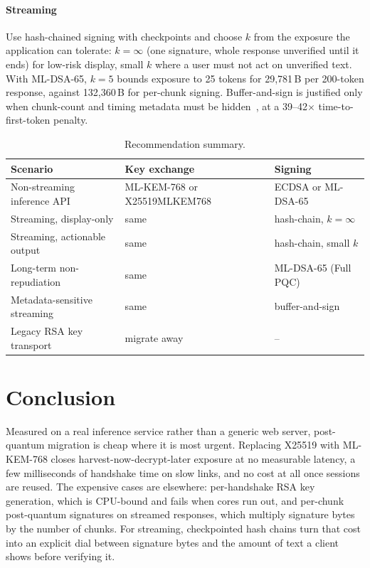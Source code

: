 \paragraph*{Streaming} Use hash-chained signing with checkpoints and choose $k$ from the exposure
the application can tolerate: $k=\infty$ (one signature, whole response unverified until it ends)
for low-risk display, small $k$ where a user must not act on unverified text. With ML-DSA-65,
$k{=}5$ bounds exposure to 25 tokens for 29,781\,B per 200-token response, against 132,360\,B for
per-chunk signing. Buffer-and-sign is justified only when chunk-count and timing metadata must be
hidden~\cite{weiss2024keylogging}, at a 39--42$\times$ time-to-first-token penalty.

\begin{table}[t]
\centering
\caption{Recommendation summary.}
\label{tab:recommendations}
\setlength{\tabcolsep}{3pt}
\begin{tabular}{@{}lll@{}}
\toprule
Scenario & Key exchange & Signing \\
\midrule
Non-streaming inference API & ML-KEM-768 or X25519MLKEM768 & ECDSA or ML-DSA-65 \\
Streaming, display-only & same & hash-chain, $k=\infty$ \\
Streaming, actionable output & same & hash-chain, small $k$ \\
Long-term non-repudiation & same & ML-DSA-65 (Full PQC) \\
Metadata-sensitive streaming & same & buffer-and-sign \\
Legacy RSA key transport & migrate away & -- \\
\bottomrule
\end{tabular}
\end{table}

\section{Conclusion}
Measured on a real inference service rather than a generic web server, post-quantum migration is
cheap where it is most urgent. Replacing X25519 with ML-KEM-768 closes harvest-now-decrypt-later
exposure at no measurable latency, a few milliseconds of handshake time on slow links, and no cost at
all once sessions are reused. The expensive cases are elsewhere: per-handshake RSA key generation,
which is CPU-bound and fails when cores run out, and per-chunk post-quantum signatures on streamed
responses, which multiply signature bytes by the number of chunks. For streaming, checkpointed hash
chains turn that cost into an explicit dial between signature bytes and the amount of text a client
shows before verifying it.
